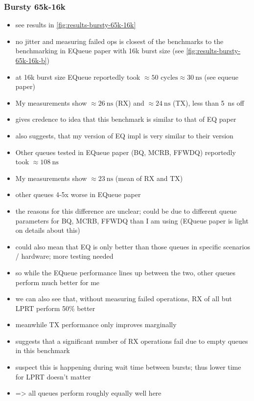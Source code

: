 \subsubsection{Bursty 65k-16k}
\begin{itemize}
    \item see results in \autoref{fig:results-bursty-65k-16k}
    \item no jitter and measuring failed ops is closest of the benchmarks to the benchmarking in EQueue paper
        with 16k burst size (see \autoref{fig:results-bursty-65k-16k-b})
    \item at 16k burst size EQueue reportedly took $\approx 50\text{ cycles} \approx \SI{30}{\nano\second}$
        (see equeue paper)
    \item My measurements show $\approx \SI{26}{\nano\second}$ (RX) and $\approx \SI{24}{\nano\second}$ (TX),
        less than \SI{5}{\nano\second} off
    \item gives credence to idea that this benchmark is similar to that of EQ paper
    \item also suggests, that my version of EQ impl is very similar to their version
    \item Other queues tested in EQueue paper (BQ, MCRB, FFWDQ) reportedly took $\approx \SI{108}{\nano\second}$
    \item My measurements show $\approx \SI{23}{\nano\second}$ (mean of RX and TX)
    \item other queues 4-5x worse in EQueue paper
    \item the reasons for this difference are unclear; could be due to different queue parameters for BQ, MCRB, FFWDQ than I am using (EQueue paper is light on details about this)
    \item could also mean that EQ is only better than those queues in specific scenarios / hardware; more testing needed
    \item so while the EQueue performance lines up between the two, other queues perform much better for me
    \item we can also see that, without measuring failed operations, RX of all but LPRT perform 50\% better
    \item meanwhile TX performance only improves marginally
    \item suggests that a significant number of RX operations fail due to empty queues in this benchmark
    \item suspect this is happening during wait time between bursts; thus lower time for LPRT doesn't matter
    \item => all queues perform roughly equally well here
\end{itemize}


